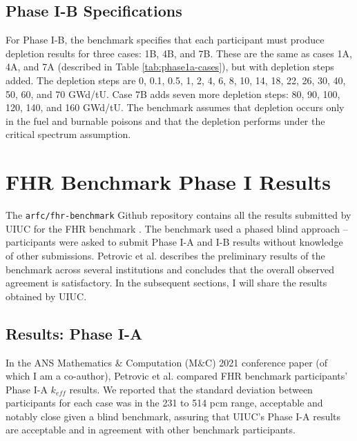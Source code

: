 \subsection{Phase I-B Specifications}
For Phase I-B, the benchmark specifies that each participant must produce 
depletion results for three cases: 1B, 4B, and 7B. 
These are the same as cases 1A, 4A, and 7A (described in Table \ref{tab:phase1a-cases}), 
but with depletion steps added. 
The depletion steps are 0, 0.1, 0.5, 1, 2, 4, 6, 8, 10, 14, 18, 22, 26, 30, 40, 50, 
60, and 70 GWd/tU. 
Case 7B adds seven more depletion steps: 80, 90, 100, 120, 140, and 160 GWd/tU. 
The benchmark assumes that depletion occurs only in the fuel and burnable poisons 
and that the depletion performs under the critical spectrum assumption. 

\section{FHR Benchmark Phase I Results}
The \texttt{arfc/fhr-benchmark} Github repository contains all the results submitted 
by \gls{UIUC} for the \gls{FHR} benchmark \cite{chee_arfcfhr-benchmark_2021}. 
The benchmark used a phased blind approach -- participants were asked to 
submit Phase I-A and I-B results without knowledge of other submissions. 
Petrovic et al. \cite{petrovic_preliminary_2021} describes the preliminary 
results of the benchmark across several institutions and concludes 
that the overall observed agreement is satisfactory. 
In the subsequent sections, I will share the results obtained by \gls{UIUC}. 

\subsection{Results: Phase I-A}
In the \gls{ANS} Mathematics \& Computation (M$\&$C) 2021 conference 
paper (of which I am a co-author), Petrovic et al. \cite{petrovic_preliminary_2021} 
compared \gls{FHR} benchmark participants' Phase I-A $k_{eff}$ results.  
We reported that the standard deviation between participants for each case 
was in the 231 to 514 pcm range, acceptable and notably close given a blind 
benchmark, assuring that \gls{UIUC}'s Phase I-A results are acceptable and 
in agreement with other benchmark participants. 

